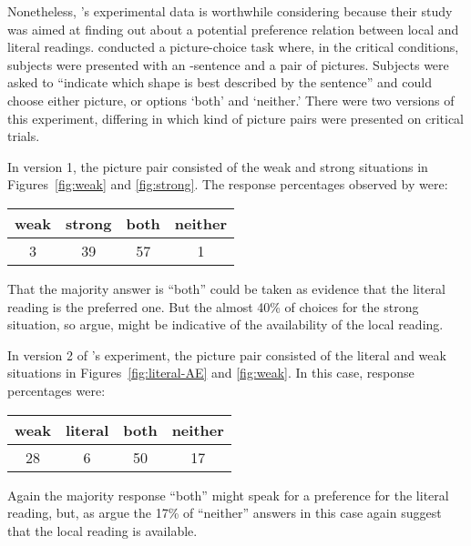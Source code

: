 \documentclass[fleqn,reqno,10pt,draft]{article}
\newcommand{\as}{\acro{as}}
\begin{document}
Nonetheless, \citeauthor{CliftonDube2010:Embedded-Implic}'s
experimental data is worthwhile considering because their study was
aimed at finding out about a potential preference relation between
local and literal
readings. \citeauthor{CliftonDube2010:Embedded-Implic} conducted a
picture-choice task where, in the critical conditions, subjects were
presented with an \as-sentence and a pair of pictures. Subjects were
asked to ``indicate which shape is best described by the
sentence'' and could choose either picture, or options `both'
and `neither.' There were two versions of this experiment, differing
in which kind of picture pairs were presented on critical trials.

In version 1, the picture pair consisted of the weak and strong
situations in Figures~\ref{fig:weak} and
\ref{fig:strong}. The response percentages observed by
\citeauthor{CliftonDube2010:Embedded-Implic} were:

\begin{center}
  \begin{tabular}{cccc}
    weak & strong & both & neither
    \\ \midrule 
 3 & 39 & 57 & 1 
  \end{tabular}
\end{center}

\noindent That the majority answer is ``both'' could be taken as
evidence that the literal reading is the preferred one. But the almost
40\% of choices for the strong situation, so
\citeauthor{CliftonDube2010:Embedded-Implic} argue, might be
indicative of the availability of the local reading.

In version 2 of \citeauthor{CliftonDube2010:Embedded-Implic}'s
experiment, the picture pair consisted of the literal and weak
situations in Figures~\ref{fig:literal-AE} and \ref{fig:weak}. In this
case, response percentages were:

\begin{center}
  \begin{tabular}{cccc}
    weak & literal & both & neither
    \\ \midrule 
    28 & 6 & 50 & 17 
  \end{tabular}
\end{center}

\noindent Again the majority response ``both'' might speak for a
preference for the literal reading, but, as
\citeauthor{CliftonDube2010:Embedded-Implic} argue the 17\% of
``neither'' answers in this case again suggest that the local reading
is available.
\end{document}
